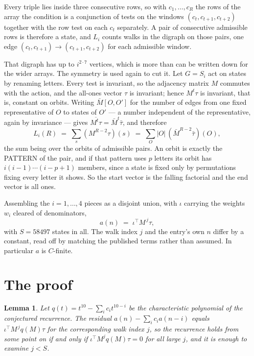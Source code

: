 \documentclass[11pt,a4paper]{article}
\theoremstyle{plain}
\newtheorem{lemma}[theorem]{Lemma}
\theoremstyle{definition}
\begin{document}
Every triple lies inside three consecutive rows, so with $c_1,\dots,c_R$ the rows of the array
the condition is a conjunction of tests on the windows $(c_{t},c_{t+1},c_{t+2})$ together
with the row test on each $c_t$ separately. A pair of consecutive admissible rows is therefore
a state, and $L_i$ counts walks in the digraph on those pairs, one edge $(c_t,c_{t+1})\to
(c_{t+1},c_{t+2})$ for each admissible window.

That digraph has up to $i^{2\cdot7}$ vertices, which is more than can be written down for
the wider arrays. The symmetry is used again to cut it. Let $G=S_i$ act on states by renaming
letters. Every test is invariant, so the adjacency matrix $M$ commutes with the action, and the
all-ones vector $\tau$ is invariant; hence $M^{t}\tau$ is invariant, that is, constant on
orbits. Writing $\bar M[O,O']$ for the number of edges from one fixed representative of $O$ to
states of $O'$ --- a number independent of the representative, again by invariance --- gives
$\overline{M^{t}\tau}=\bar M^{t}\bar\tau$, and therefore
\[
L_i(R)\;=\;\sum_{s}(M^{R-2}\tau)(s)\;=\;\sum_{O}|O|\,(\bar M^{R-2}\bar\tau)(O),
\]
the sum being over the orbits of admissible pairs. An orbit is exactly the PATTERN of the pair,
and if that pattern uses $p$ letters its orbit has $i(i-1)\cdots(i-p+1)$ members, since a state
is fixed only by permutations fixing every letter it shows. So the start vector is the falling
factorial and the end vector is all ones.

Assembling the $i=1,\dots,4$ pieces as a disjoint union, with $\iota$ carrying the weights
$w_i$ cleared of denominators,
\[
a(n)\;=\;\iota^{\!\top}M^{\,j}\tau ,
\]
with $S=58497$ states in all. The walk index $j$ and the entry's own $n$ differ by a constant,
read off by matching the published terms rather than assumed. In particular $a$ is $C$-finite.

\section{The proof}

\begin{lemma}\label{lem:crit}
Let $q(t)=t^{10}-\sum_i c_it^{10-i}$ be the characteristic polynomial of the
conjectured recurrence. The residual $a(n)-\sum_ic_ia(n-i)$ equals
$\iota^{\!\top}M^{\,j}q(M)\tau$ for the corresponding walk index $j$, so the recurrence
holds from some point on if and only if $\iota^{\!\top}M^{j}q(M)\tau=0$ for all large $j$,
and it is enough to examine $j<S$.
\end{lemma}
\end{document}
